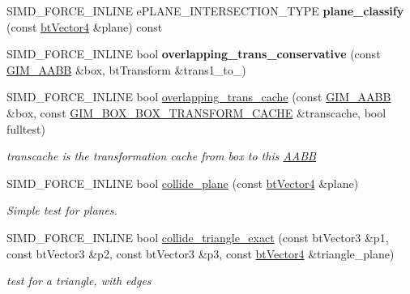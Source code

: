 \begin{DoxyCompactItemize}
\item 
\mbox{\label{classGIM__AABB_ad811957871e0428393603f9c7af21585}} 
S\+I\+M\+D\+\_\+\+F\+O\+R\+C\+E\+\_\+\+I\+N\+L\+I\+NE e\+P\+L\+A\+N\+E\+\_\+\+I\+N\+T\+E\+R\+S\+E\+C\+T\+I\+O\+N\+\_\+\+T\+Y\+PE {\bfseries plane\+\_\+classify} (const \hyperlink{classbtVector4}{bt\+Vector4} \&plane) const
\item 
\mbox{\label{classGIM__AABB_a9f15bee8c497a7c09221a07ad0f01695}} 
S\+I\+M\+D\+\_\+\+F\+O\+R\+C\+E\+\_\+\+I\+N\+L\+I\+NE bool {\bfseries overlapping\+\_\+trans\+\_\+conservative} (const \hyperlink{classGIM__AABB}{G\+I\+M\+\_\+\+A\+A\+BB} \&box, bt\+Transform \&trans1\+\_\+to\+\_)
\item 
\mbox{\label{classGIM__AABB_af4c6c48e03d316e74e00b2ab261fd125}} 
S\+I\+M\+D\+\_\+\+F\+O\+R\+C\+E\+\_\+\+I\+N\+L\+I\+NE bool \hyperlink{classGIM__AABB_af4c6c48e03d316e74e00b2ab261fd125}{overlapping\+\_\+trans\+\_\+cache} (const \hyperlink{classGIM__AABB}{G\+I\+M\+\_\+\+A\+A\+BB} \&box, const \hyperlink{classGIM__BOX__BOX__TRANSFORM__CACHE}{G\+I\+M\+\_\+\+B\+O\+X\+\_\+\+B\+O\+X\+\_\+\+T\+R\+A\+N\+S\+F\+O\+R\+M\+\_\+\+C\+A\+C\+HE} \&transcache, bool fulltest)
\begin{DoxyCompactList}\small\item\em transcache is the transformation cache from box to this \hyperlink{classAABB}{A\+A\+BB} \end{DoxyCompactList}\item 
\mbox{\label{classGIM__AABB_a05940e89bdd3fa59cc8cd3af6e1b876c}} 
S\+I\+M\+D\+\_\+\+F\+O\+R\+C\+E\+\_\+\+I\+N\+L\+I\+NE bool \hyperlink{classGIM__AABB_a05940e89bdd3fa59cc8cd3af6e1b876c}{collide\+\_\+plane} (const \hyperlink{classbtVector4}{bt\+Vector4} \&plane)
\begin{DoxyCompactList}\small\item\em Simple test for planes. \end{DoxyCompactList}\item 
\mbox{\label{classGIM__AABB_a4a1ffa196d3981313fccf9e01aa383f9}} 
S\+I\+M\+D\+\_\+\+F\+O\+R\+C\+E\+\_\+\+I\+N\+L\+I\+NE bool \hyperlink{classGIM__AABB_a4a1ffa196d3981313fccf9e01aa383f9}{collide\+\_\+triangle\+\_\+exact} (const bt\+Vector3 \&p1, const bt\+Vector3 \&p2, const bt\+Vector3 \&p3, const \hyperlink{classbtVector4}{bt\+Vector4} \&triangle\+\_\+plane)
\begin{DoxyCompactList}\small\item\em test for a triangle, with edges \end{DoxyCompactList}\end{DoxyCompactItemize}
